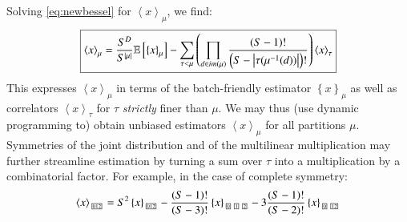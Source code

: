 \documentclass{article}
\theoremstyle{plain}
\theoremstyle{definition}
\newcommand{\wrap}[1]{\left(#1\right)}
\newcommand{\wang}[1]{\left\langle#1\right\rangle}
\newcommand{\wabs}[1]{\left|#1\right|}
\newcommand{\wurl}[1]{\left\{#1\right\}}
\newcommand{\partitionbox}[1]{
    \text{
        \fboxsep=0.5pt
        \tiny
        \fbox{#1}
    }
}
\newcommand{\expct}[1]{\mathbb{E}\left[#1\right]}
\begin{document}
        Solving \ref{eq:newbessel} for $\wang{x}_\mu$, we find:
        \begin{equation*}
            \text{\fbox{$
            \wang{x}_\mu
            =
            \frac{S^D}{S^{\wabs{\mu}}}
            \expct{
                \wurl{x}_\mu
            }
            -
            \sum_{\tau < \mu} \wrap{
                \prod_{d\in im(\mu)}
                \frac{\wrap{S-1}!}{\wrap{S-\wabs{\tau(\mu^{-1}(d))}}!}
            }
            \wang{x}_\tau
            $}}
        \end{equation*}
        This expresses $\wang{x}_\mu$ in terms of the batch-friendly estimator
        $\wurl{x}_\mu$ as well as correlators $\wang{x}_\tau$ for $\tau$
        \emph{strictly} finer than $\mu$.  We may thus (use dynamic programming
        to) obtain unbiased estimators $\wang{x}_\mu$ for all partitions $\mu$.
        Symmetries of the joint distribution and of the multilinear
        multiplication may further streamline estimation by turning a sum over
        $\tau$ into a multiplication by a combinatorial factor.  For example,
        in the case of complete symmetry:
        $$
            \wang{x}_{\partitionbox{012}}
            =
            S^2
            \wurl{x}_{\partitionbox{012}}
            -
            \frac{(S-1)!}{(S-3)!}
            \wurl{x}_{\partitionbox{0}\partitionbox{1}\partitionbox{2}}
            -
            3\frac{(S-1)!}{(S-2)!}
            \wurl{x}_{\partitionbox{0}\partitionbox{12}}
        $$
\end{document}
